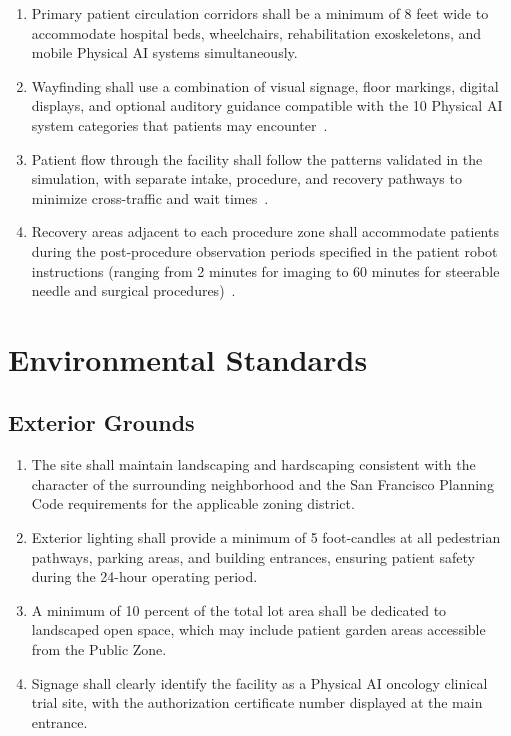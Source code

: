 \documentclass[11pt,letterpaper]{article}
\begin{document}
\begin{enumerate}[label=(\alph*)]
\item Primary patient circulation corridors shall be a minimum of 8 feet wide
  to accommodate hospital beds, wheelchairs, rehabilitation exoskeletons, and
  mobile Physical AI systems simultaneously.

\item Wayfinding shall use a combination of visual signage, floor markings,
  digital displays, and optional auditory guidance compatible with the 10
  Physical AI system categories that patients may
  encounter~\cite{patientinstructions2026}.

\item Patient flow through the facility shall follow the patterns validated in
  the simulation, with separate intake, procedure, and recovery pathways to
  minimize cross-traffic and wait times~\cite{newtrial2026}.

\item Recovery areas adjacent to each procedure zone shall accommodate patients
  during the post-procedure observation periods specified in the patient robot
  instructions (ranging from 2 minutes for imaging to 60 minutes for steerable
  needle and surgical procedures)~\cite{patientinstructions2026}.
\end{enumerate}

\section{Environmental Standards}

\subsection{Exterior Grounds}

\begin{enumerate}[label=(\alph*)]
\item The site shall maintain landscaping and hardscaping consistent with the
  character of the surrounding neighborhood and the San Francisco Planning
  Code requirements for the applicable zoning district.

\item Exterior lighting shall provide a minimum of 5 foot-candles at all
  pedestrian pathways, parking areas, and building entrances, ensuring patient
  safety during the 24-hour operating period.

\item A minimum of 10 percent of the total lot area shall be dedicated to
  landscaped open space, which may include patient garden areas accessible from
  the Public Zone.

\item Signage shall clearly identify the facility as a Physical AI oncology
  clinical trial site, with the authorization certificate number displayed at
  the main entrance.
\end{enumerate}
\end{document}
